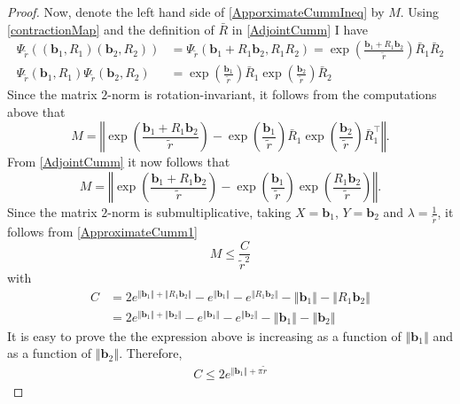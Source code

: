 \documentclass[a4paper,11pt]{scrartcl}
\numberwithin{dummy}{section}
\theoremstyle{plain}
\theoremstyle{plain}
\theoremstyle{plain}
\theoremstyle{plain}
\theoremstyle{nonumberplain}
\newtheorem{proof}{Proof}
\newcommand{\Ltwonorm}[1]{\left\Vert #1 \right\Vert} %
\begin{document}
\begin{proof}
		Now, denote the left hand side of \eqref{ApporximateCummIneq} by $ M $. Using \eqref{contractionMap} and the definition of $ \bar{R} $ in \eqref{AdjointCumm} I have
		\begin{align*}
		\Psi_{\widetilde{r}} \left( (\mathbf{b}_{1}, R_{1}) (\mathbf{b}_{2}, R_{2})\right)
		&= \Psi_{\widetilde{r}} \left( \mathbf{b}_{1} + R_{1} \mathbf{b}_{2}, R_{1} R_{2} \right)
		= \exp \left( \frac{\mathbf{b}_{1} + R_{1} \mathbf{b}_{2} }{\widetilde{r}} \right) \bar{R}_{1} \bar{R}_{2} \\
		\Psi_{\widetilde{r}} (\mathbf{b}_{1}, R_{1}) \Psi_{\widetilde{r}} (\mathbf{b}_{2}, R_{2})
		&= \exp \left( \frac{\mathbf{b}_{1}}{\widetilde{r}} \right) \bar{R}_{1} \exp \left( \frac{\mathbf{b}_{2}}{\widetilde{r}} \right) \bar{R}_{2} 
		\end{align*}
		Since the matrix $ 2 $-norm is rotation-invariant, it follows from the computations above that
		\begin{equation*}
		M
		= \Ltwonorm{\exp \left( \frac{\mathbf{b}_{1} + R_{1} \mathbf{b}_{2}}{\widetilde{r}} \right) - \exp \left( \frac{\mathbf{b}_{1}}{\widetilde{r}} \right) \bar{R}_{1} \exp \left( \frac{\mathbf{b}_{2}}{\widetilde{r}} \right) \bar{R}_{1}^{\top} }.
		\end{equation*}
		From \eqref{AdjointCumm} it now follows that
		\begin{equation*}
		M 
		= \Ltwonorm{\exp \left( \frac{\mathbf{b}_{1} + R_{1} \mathbf{b}_{2}}{\widetilde{r}} \right) - \exp \left( \frac{\mathbf{b}_{1}}{\widetilde{r}} \right) \exp \left( \frac{R_{1} \mathbf{b}_{2}}{\widetilde{r}} \right) }.
		\end{equation*}
		Since the matrix $ 2 $-norm is submultiplicative, taking $ X = \mathbf{b}_{1} $, $ Y = \mathbf{b}_{2} $ and $ \lambda = \frac{1}{\widetilde{r}} $, it follows from \cref{ApproximateCumm1} 
		\begin{equation*}
		M 
		\le \frac{C}{\widetilde{r}^{2}}
		\end{equation*}
		with 
		\begin{align*}
		C
		&= 2 e^{\Ltwonorm{\mathbf{b}_{1}} + \Ltwonorm{R_{1} \mathbf{b}_{2}}} - e^{\Ltwonorm{\mathbf{b}_{1}}} - e^{\Ltwonorm{R_{1} \mathbf{b}_{2}}} - \Ltwonorm{\mathbf{b}_{1}} - \Ltwonorm{R_{1} \mathbf{b}_{2}} \\
		&= 2 e^{\Ltwonorm{\mathbf{b}_{1}} + \Ltwonorm{\mathbf{b}_{2}}} - e^{\Ltwonorm{\mathbf{b}_{1}}} - e^{\Ltwonorm{\mathbf{b}_{2}}} - \Ltwonorm{\mathbf{b}_{1}} - \Ltwonorm{\mathbf{b}_{2}} 
		\end{align*}
		It is easy to prove the the expression above is increasing as a function of $ \Ltwonorm{\mathbf{b}_{1}} $ and as a function of $ \Ltwonorm{\mathbf{b}_{2}} $. Therefore, 
		\begin{align*}
		C 
		\le 2 e^{\Ltwonorm{\mathbf{b}_{1}} + \pi \widetilde{r}}
		\end{align*}
	\end{proof}
	
\end{document}
